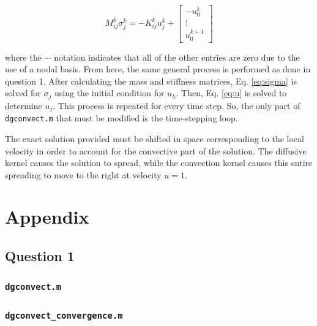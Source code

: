 \documentclass[10pt]{article}
\newcommand{\beq}{\begin{equation}}
\newcommand{\eeq}{\end{equation}}
\begin{document}
\beq
\label{eq:sigma}
M_{ij}^k\sigma_j^k=-K_{ij}^ku_j^k+\begin{bmatrix}-u_0^k\\\vdots\\u_0^{k+1}\end{bmatrix}
\eeq

where the \(\cdots\) notation indicates that all of the other entries are zero due to the use of a nodal basis. From here, the same general process is performed as done in question 1. After calculating the mass and stiffness matrices, Eq. \eqref{eq:sigma} is solved for \(\sigma_j\) using the initial condition for \(u_h\). Then, Eq. \eqref{eq:u} is solved to determine \(u_j\). This process is repeated for every time step. So, the only part of {\tt dgconvect.m} that must be modified is the time-stepping loop.

The exact solution provided must be shifted in space corresponding to the local velocity in order to account for the convective part of the solution. The diffusive kernel causes the solution to spread, while the convection kernel causes this entire spreading to move to the right at velocity \(u=1\). 



\section{Appendix}
\subsection{Question 1}
\subsubsection{{\tt dgconvect.m}}

\subsubsection{{\tt dgconvect\_convergence.m}}

\end{document}

